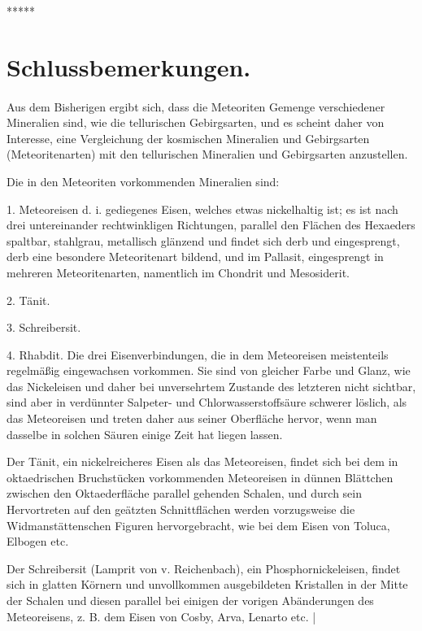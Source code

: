 \documentclass[a4paper, 11pt, oneside]{article}
\begin{document}
\centerline{*\hspace{15mm}*\hspace{15mm}*\hspace{15mm}*\hspace{15mm}*}
\clearpage
\section{Schlussbemerkungen.}
\paragraph{}
Aus dem Bisherigen ergibt sich, dass die Meteoriten Gemenge verschiedener Mineralien sind, wie die tellurischen Gebirgsarten, und es scheint daher von Interesse, eine Vergleichung der kosmischen Mineralien und Gebirgsarten (Meteoritenarten) mit den tellurischen Mineralien und Gebirgsarten anzustellen.

Die in den Meteoriten vorkommenden Mineralien sind:

1. Meteoreisen d. i. gediegenes Eisen, welches etwas nickelhaltig ist; es ist nach drei untereinander rechtwinkligen Richtungen, parallel den Flächen des Hexaeders spaltbar, stahlgrau, metallisch glänzend und findet sich derb und eingesprengt, derb eine besondere Meteoritenart bildend, und im Pallasit, eingesprengt in mehreren Meteoritenarten, namentlich im Chondrit und Mesosiderit.

2. Tänit.

3. Schreibersit.

4. Rhabdit. Die drei Eisenverbindungen, die in dem Meteoreisen meistenteils regelmäßig eingewachsen vorkommen. Sie sind von gleicher Farbe und Glanz, wie das Nickeleisen und daher bei unversehrtem Zustande des letzteren nicht sichtbar, sind aber in verdünnter Salpeter- und Chlorwasserstoffsäure schwerer löslich, als das Meteoreisen und treten daher aus seiner Oberfläche hervor, wenn man dasselbe in solchen Säuren einige Zeit hat liegen lassen.

Der Tänit, ein nickelreicheres Eisen als das Meteoreisen, findet sich bei dem in oktaedrischen Bruchstücken vorkommenden Meteoreisen in dünnen Blättchen zwischen den Oktaederfläche parallel gehenden Schalen, und durch sein Hervortreten auf den geätzten Schnittflächen werden vorzugsweise die Widmanstättenschen Figuren hervorgebracht, wie bei dem Eisen von Toluca, Elbogen etc.

Der Schreibersit (Lamprit von v. Reichenbach), ein Phosphornickeleisen, findet sich in glatten Körnern und unvollkommen ausgebildeten Kristallen in der Mitte der Schalen und diesen parallel bei einigen der vorigen Abänderungen des Meteoreisens, z. B. dem Eisen von Cosby, Arva, Lenarto etc. |
\end{document}
